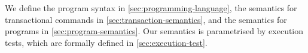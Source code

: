 We define the program syntax in  \cref{sec:programming-language},
the semantics for transactional commands in \cref{sec:transaction-semantics},
and the semantics for programs in \cref{sec:program-semantics}.
Our semantics is parametrised by execution tests,
which are formally defined in \cref{sec:execution-test}.
